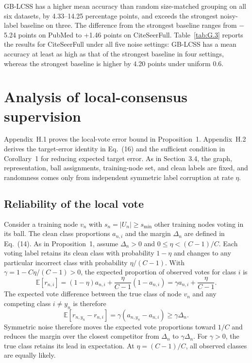 \documentclass[10pt,letterpaper,nopreprintline]{elsarticle}
\begin{document}
GB-LCSS has a higher mean accuracy than random size-matched grouping on all six datasets, by 4.33--14.25 percentage points, and exceeds the strongest noisy-label baseline on three. The difference from the strongest baseline ranges from \ensuremath{-}5.24 points on PubMed to +1.46 points on CiteSeerFull. Table~\ref{tab:G.3} reports the results for CiteSeerFull under all five noise settings: GB-LCSS has a mean accuracy at least as high as that of the strongest baseline in four settings, whereas the strongest baseline is higher by 4.20 points under uniform 0.6.



\FloatBarrier
\setcounter{table}{0}
\section{Analysis of local-consensus supervision}\label{sec:H}
\setcounter{equation}{0}
\renewcommand{\theequation}{H.\arabic{equation}}
\renewcommand{\theHequation}{H.\arabic{equation}}

Appendix~H.1 proves the local-vote error bound in Proposition~1. Appendix~H.2 derives the target-error identity in Eq.~(16) and the sufficient condition in Corollary~1 for reducing expected target error. As in Section~3.4, the graph, representation, ball assignments, training-node set, and clean labels are fixed, and randomness comes only from independent symmetric label corruption at rate \(\eta\).

\subsection{Reliability of the local vote}\label{sec:H.1}

Consider a training node \(v_n\) with \(s_n=|U_n|\geq s_{\min}\) other training nodes voting in its ball. The clean class proportions \(a_{n,i}\) and the margin \(\Delta_n\) are defined in Eq.~(14). As in Proposition~1, assume \(\Delta_n>0\) and \(0\leq\eta<(C-1)/C\). Each voting label retains its clean class with probability \(1-\eta\) and changes to any particular incorrect class with probability \(\eta/(C-1)\). With \(\gamma=1-C\eta/(C-1)>0\), the expected proportion of observed votes for class \(i\) is
\begin{equation}\label{eq:H.1}
\mathbb{E}[r_{n,i}]=(1-\eta)a_{n,i}
+\frac{\eta}{C-1}(1-a_{n,i})
=\gamma a_{n,i}+\frac{\eta}{C-1}.
\end{equation}
The expected vote difference between the true class of node \(v_n\) and any competing class \(i\ne y_n\) is therefore
\begin{equation}\label{eq:H.2}
\mathbb{E}[r_{n,y_n}-r_{n,i}]
=\gamma(a_{n,y_n}-a_{n,i})\geq\gamma\Delta_n.
\end{equation}
Symmetric noise therefore moves the expected vote proportions toward \(1/C\) and reduces the margin over the closest competitor from \(\Delta_n\) to \(\gamma\Delta_n\). For \(\gamma>0\), the true class retains its lead in expectation. At \(\eta=(C-1)/C\), all observed classes are equally likely.
\end{document}
